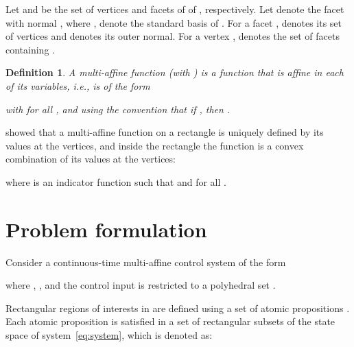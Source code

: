 \documentclass{ifacconf}
\newtheorem{definition}{Definition}
\begin{document}
Let  and  be the set of vertices and facets of 
of , respectively. 
Let  denote the facet with normal , where 
,  denote the standard basis of .
For a facet ,   denotes its set of vertices
and  denotes its outer normal. For a vertex ,  denotes the set of facets containing . 

\begin{definition}
  \label{def:multiaffine}
  A {\em multi-affine function}  (with ) is a function that is affine in
  each of its variables, i.e.,  is of the form
  
  with  for all , and using the convention that if , then
  .
\end{definition}

\cite{Belta-TAC06} showed  that a multi-affine function  on a rectangle  is uniquely defined by its values at the vertices, and inside the rectangle the function is a convex combination of its values at the vertices:

where  is an indicator function such that  and  for all .

\section{Problem formulation}\label{sec:prob}

Consider a continuous-time multi-affine control system of the form

where , , and the control input  is restricted to a polyhedral set .

Rectangular regions of interests in  are defined using a set of atomic propositions . Each atomic proposition  is satisfied in a set of  rectangular subsets of the state space of system~\eqref{eq:system}, which is denoted as:
\end{document}

